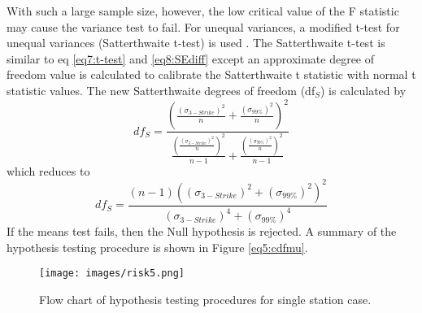 With such a large sample size, however, the low critical value of the F statistic may cause the variance test to fail. For unequal variances, a modified t-test for unequal variances (Satterthwaite t-test) is used \citep{Ruxton2006}.  The Satterthwaite t-test is similar to eq \ref{eq7:t-test} and \ref{eq8:SEdiff} except an approximate degree of freedom value is calculated to calibrate the Satterthwaite t statistic with normal t statistic values. The new Satterthwaite degrees of freedom (df$_{S}$) is calculated by
%
\begin{equation}
\label{eq9:sath_dfs}
df_{S} = \frac{\left(\frac{(\sigma_{3-Strike})^{2}}{n}+\frac{(\sigma_{99\%})^{2}}{n}\right)^{2}}{ \frac{\left(\frac{(\sigma_{3-Strike})^{2}}{n}\right )^{2}}{n-1}+\frac{\left(\frac{(\sigma_{99\%})^{2}}{n}\right )^{2}}{n-1}}
\end{equation}
%
\noindent
which reduces to
%
\begin{equation}
\label{eq10:sath_dfs_reduce}
df_{S} = \frac{(n-1)\left ((\sigma_{3-Strike})^{2}+(\sigma_{99\%})^{2}\right )^{2}}{(\sigma_{3-Strike})^{4}+(\sigma_{99\%})^{4}}
\end{equation}
%
If the means test fails, then the Null hypothesis is rejected.  A summary of the hypothesis testing procedure is shown in Figure \ref{eq5:cdfmu}.
%  
\begin{figure}[H]
\centering
\texttt{[image: images/risk5.png]} 
\caption{Flow chart of hypothesis testing procedures for single station case.}
\label{fig5:flowchart}
\end{figure}
%
